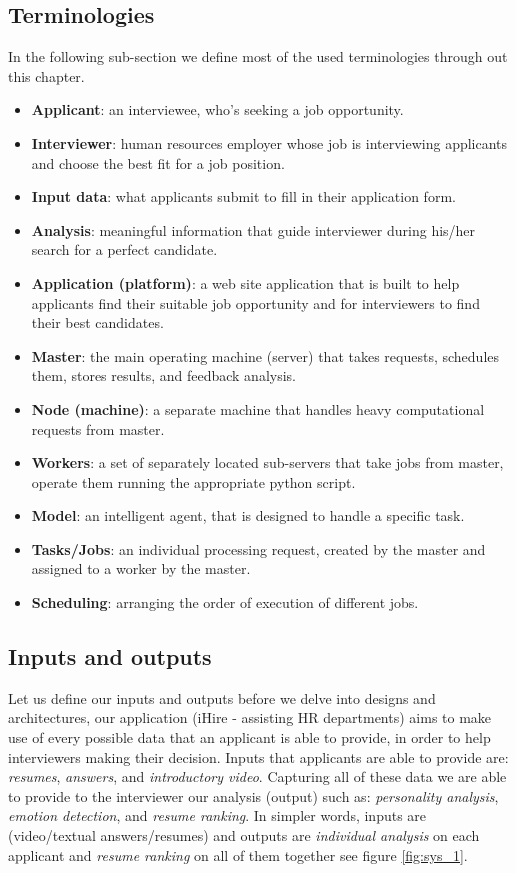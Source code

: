\subsection{Terminologies}
In the following sub-section we define most of the used terminologies through out this chapter.
\begin{itemize}
\item \textbf{Applicant}: an interviewee, who's seeking a job opportunity.
\item \textbf{Interviewer}: human resources employer whose job is interviewing applicants and choose the best fit for a job position.
\item\textbf{Input data}: what applicants submit to fill in their application form.
\item\textbf{Analysis}: meaningful information that guide interviewer during his/her search for a perfect candidate.
\item\textbf{Application (platform)}: a web site application that is built to help applicants find their suitable job opportunity and for interviewers to find their best candidates.
\item\textbf{Master}: the main operating machine (server) that takes requests, schedules them, stores results, and feedback analysis.
\item\textbf{Node (machine)}: a separate machine that handles heavy computational requests from master.
\item\textbf{Workers}: a set of separately located sub-servers that take jobs from master, operate them running the appropriate python script.
\item\textbf{Model}: an intelligent agent, that is designed to handle a specific task.
\item \textbf{Tasks/Jobs}: an individual processing request, created by the master and assigned to a worker by the master.
\item \textbf{Scheduling}: arranging the order of execution of different jobs.


\end{itemize}


\subsection{Inputs and outputs}
\label{sec:in_out}
Let us define our inputs and outputs before we delve into designs and architectures, our application (iHire - assisting HR departments) aims to make use of every possible data that an applicant is able to provide, in order to help interviewers making their decision. Inputs that applicants are able to provide are: \textit{resumes}, \textit{answers}, and \textit{introductory video}. Capturing all of these data we are able to provide to the interviewer our analysis (output) such as: \textit{personality analysis}, \textit{emotion detection}, and \textit{resume ranking}. In simpler words, inputs are (video/textual answers/resumes) and outputs are \textit{individual analysis} on each applicant and \textit{resume ranking} on all of them together see figure \ref{fig:sys_1}.

